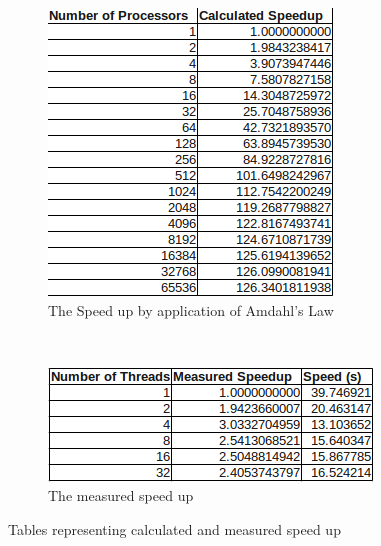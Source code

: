 \documentclass[11pt]{article} %
\begin{document}
\begin{figure}[h]
\centering
\begin{subfigure}[b]{0.48\textwidth}
\centering
\includegraphics[width=\textwidth]{Speedup.png}
\caption{The Speed up by application of Amdahl's Law}
\label{fig: speedup}
\end{subfigure}
~ 
\begin{subfigure}[b]{0.48\textwidth}
\centering
\includegraphics[width=\textwidth]{measured.png}
\caption{The measured speed up}
\label{fig: measured}
\end{subfigure}
\caption{Tables representing calculated and measured speed up}
\end{figure}
\end{document}
